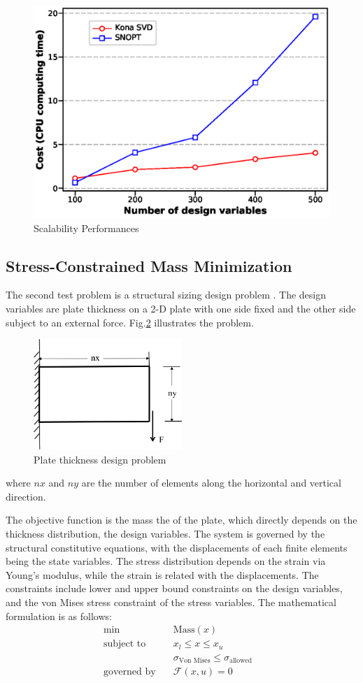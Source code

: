 \documentclass{article}
\theoremstyle{definition}
\begin{document}
\begin{figure}[H]
  \centering
  \includegraphics[clip,width=0.5\columnwidth]{./figs/ndv_cost.eps}%
  \caption{Scalability Performances}
  \label{fig:ndvcosttoy}
\end{figure}


\subsection{Stress-Constrained Mass Minimization}
The second test problem is a structural sizing design problem \cite{dener:scitech2016}. The design variables are plate thickness on a 2-D plate with one side fixed and the other side subject to an external force. Fig.\ref{fig:struct} illustrates the problem.
\begin{figure}[H]
  \centering
  \includegraphics[width=0.5\textwidth]{./figs/structures.png}
  \caption{Plate thickness design problem}
  \label{fig:struct}
\end{figure}
where $nx$ and $ny$ are the number of elements along the horizontal and vertical direction. 

The objective function is the mass the of the plate, which directly depends on the thickness distribution, the design variables. The system is governed by the structural constitutive equations, with the displacements of each finite elements being the state variables. The stress distribution depends on the strain via Young's modulus, while the strain is related with the displacements. The constraints include lower and upper bound constraints on the design variables, and the von Mises stress constraint of the stress variables. The mathematical formulation is as follows:
\begin{equation*}
\begin{aligned}
\text{min}  \quad & \text{Mass}(x) &\\
\text{subject to} \quad & x_l \leq x \leq x_u  \\
 &  \sigma _{\textrm{Von Mises}} \leq  \sigma_{\text{allowed}} \\
\text{governed by} \quad &  \mathcal{F}(x, u) = 0 \\
\end{aligned}
\end{equation*}
\end{document}
